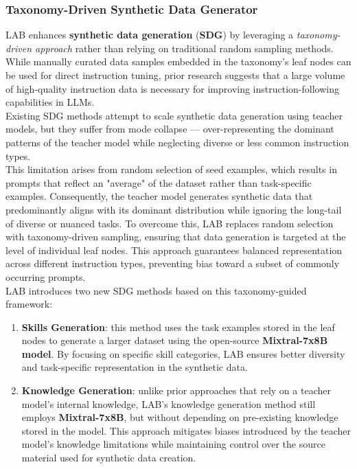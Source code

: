 \documentclass[12pt]{article}
\begin{document}
\subsubsection{Taxonomy-Driven Synthetic Data Generator}\label{tax-sdg}
LAB enhances \textbf{synthetic data generation} (\textbf{SDG}) by leveraging a \textit{taxonomy-driven approach} rather than relying on traditional random sampling methods.\\
While manually curated data samples embedded in the taxonomy’s leaf nodes can be used for direct instruction tuning, prior research suggests that a large volume of high-quality instruction data is necessary for improving instruction-following capabilities in LLMs.\vspace{14pt}\\
Existing SDG methods attempt to scale synthetic data generation using teacher models, but they suffer from mode collapse — over-representing the dominant patterns of the teacher model while neglecting diverse or less common instruction types.\vspace{14pt}\\
This limitation arises from random selection of seed examples, which results in prompts that reflect an "average" of the dataset rather than task-specific examples. Consequently, the teacher model generates synthetic data that predominantly aligns with its dominant distribution while ignoring the long-tail of diverse or nuanced tasks. To overcome this, LAB replaces random selection with taxonomy-driven sampling, ensuring that data generation is targeted at the level of individual leaf nodes. This approach guarantees balanced representation across different instruction types, preventing bias toward a subset of commonly occurring prompts.\vspace{14pt}\\
LAB introduces two new SDG methods based on this taxonomy-guided framework:
\begin{enumerate}
    \item \textbf{Skills Generation}: this method uses the task examples stored in the leaf nodes to generate a larger dataset using the open-source \textbf{Mixtral-7x8B model}. By focusing on specific skill categories, LAB ensures better diversity and task-specific representation in the synthetic data.  
    \item \textbf{Knowledge Generation}: unlike prior approaches that rely on a teacher model’s internal knowledge, LAB’s knowledge generation method still employs \textbf{Mixtral-7x8B}, but without depending on pre-existing knowledge stored in the model. This approach mitigates biases introduced by the teacher model’s knowledge limitations while maintaining control over the source material used for synthetic data creation.  
\end{enumerate}
\end{document}
